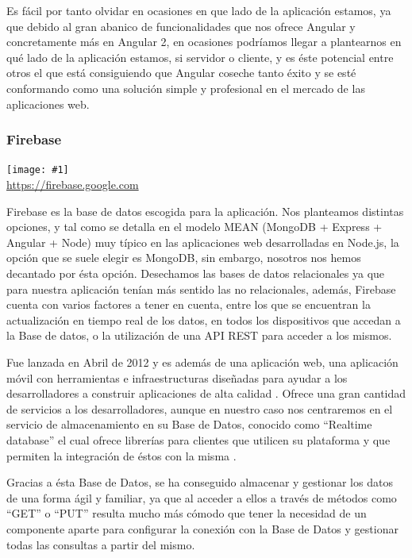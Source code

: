 \documentclass[11pt,openany]{book}
\newcommand{\logo}[2]{\medskip\begin{center}\texttt{[image: \#1]}\\\scriptsize\url{#2}\end{center}\bigskip}
\begin{document}
Es fácil por tanto olvidar en ocasiones en que lado de la aplicación estamos, ya que debido al gran abanico de funcionalidades que nos ofrece Angular y concretamente más en Angular 2, en ocasiones podríamos llegar a plantearnos en qué lado de la aplicación estamos, si servidor o cliente, y es éste potencial entre otros el que está consiguiendo que Angular coseche tanto éxito y se esté conformando como una solución simple y profesional en el mercado de las aplicaciones web.

\subsubsection{Firebase}

\logo{logos/firebase.png}{https://firebase.google.com}

Firebase es la base de datos escogida para la aplicación. Nos planteamos distintas opciones, y tal como se detalla en el modelo MEAN (MongoDB + Express + Angular + Node) muy típico en las aplicaciones web desarrolladas en Node.js, la opción que se suele elegir es MongoDB, sin embargo, nosotros nos hemos decantado por ésta opción. Desechamos las bases de datos relacionales ya que para nuestra aplicación tenían más sentido las no relacionales, además, Firebase cuenta con varios factores a tener en cuenta, entre los que se encuentran la actualización en tiempo real de los datos, en todos los dispositivos que accedan a la Base de datos, o la utilización de una API REST para acceder a los mismos.

Fue lanzada en Abril de 2012 y es además de una aplicación web, una aplicación móvil con herramientas e infraestructuras diseñadas para ayudar a los desarrolladores a construir aplicaciones de alta calidad \cite{7}. Ofrece una gran cantidad de servicios a los desarrolladores, aunque en nuestro  caso nos centraremos en el servicio de almacenamiento en su Base de Datos, conocido como ``Realtime database'' el cual ofrece librerías para clientes que utilicen su plataforma y que permiten la integración de éstos con la misma \cite{8}.

Gracias a ésta Base de Datos, se ha conseguido almacenar y gestionar los datos de una forma ágil y familiar, ya que al acceder a ellos a través de métodos como ``GET'' o ``PUT'' resulta mucho más cómodo que tener la necesidad de un componente aparte para configurar la conexión con la Base de Datos y gestionar todas las consultas a partir del mismo.
\end{document}
